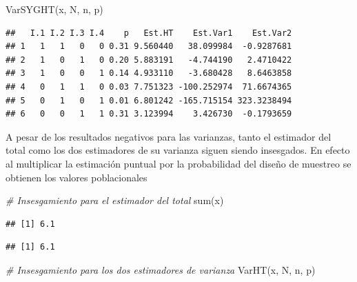 \documentclass[
  10pt,
  spanish,
]{book}
\newenvironment{Shaded}{\begin{snugshade}}{\end{snugshade}}
\newcommand{\CommentTok}[1]{\textcolor[rgb]{0.56,0.35,0.01}{\textit{#1}}}
\newcommand{\FunctionTok}[1]{\textcolor[rgb]{0.00,0.00,0.00}{#1}}
\newcommand{\NormalTok}[1]{#1}
\newcommand{\SpecialCharTok}[1]{\textcolor[rgb]{0.00,0.00,0.00}{#1}}
\begin{document}
\begin{Shaded}
\begin{Highlighting}[]
\FunctionTok{VarSYGHT}\NormalTok{(x, N, n, p)}
\end{Highlighting}
\end{Shaded}

\begin{verbatim}
##   I.1 I.2 I.3 I.4    p   Est.HT    Est.Var1    Est.Var2
## 1   1   1   0   0 0.31 9.560440   38.099984  -0.9287681
## 2   1   0   1   0 0.20 5.883191   -4.744190   2.4710422
## 3   1   0   0   1 0.14 4.933110   -3.680428   8.6463858
## 4   0   1   1   0 0.03 7.751323 -100.252974  71.6674365
## 5   0   1   0   1 0.01 6.801242 -165.715154 323.3238494
## 6   0   0   1   1 0.31 3.123994    3.426730  -0.1793659
\end{verbatim}

A pesar de los resultados negativos para las varianzas, tanto el estimador del total como los dos estimadores de su varianza siguen siendo insesgados. En efecto al multiplicar la estimación puntual por la probabilidad del diseño de muestreo se obtienen los valores poblacionales

\begin{Shaded}
\begin{Highlighting}[]
\CommentTok{\# Insesgamiento para el estimador del total}
\FunctionTok{sum}\NormalTok{(x)}
\end{Highlighting}
\end{Shaded}

\begin{verbatim}
## [1] 6.1
\end{verbatim}

\begin{Shaded}
\end{Shaded}

\begin{verbatim}
## [1] 6.1
\end{verbatim}

\begin{Shaded}
\begin{Highlighting}[]
\CommentTok{\# Insesgamiento para los dos estimadores de varianza}
\FunctionTok{VarHT}\NormalTok{(x, N, n, p)}
\end{Highlighting}
\end{Shaded}
\end{document}
